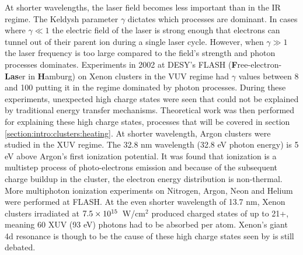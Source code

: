 At shorter wavelengths, the laser field becomes less important than in the IR
regime. The Keldysh parameter $\gamma$ dictates which processes are dominant. In
cases where $\gamma \ll 1$ the electric field of the laser is strong enough that
electrons can tunnel out of their parent ion during a single laser cycle.
However, when $\gamma \gg 1$ the laser frequency is too large compared to the
field's strength and photon processes dominates. Experiments in 2002 at
DESY's FLASH (\textbf{F}ree-electron-\textbf{Las}er in \textbf{H}amburg)\cite{Bostedt2009}
on Xenon clusters in the VUV regime had $\gamma$ values between 8 and
100\cite{Wabnitz2002} putting it in the regime dominated by photon processes.
During these experiments, unexpected high charge states were seen that could not
be explained by traditional energy transfer mechanisms. Theoretical work was
then performed for explaining these high charge states, processes that will be
covered in section \ref{section:intro:clusters:heating}. At shorter wavelength,
Argon clusters were studied in the XUV regime\cite{Bostedt2008}. The 32.8 nm
wavelength (32.8 eV photon energy) is 5 eV above Argon's first ionization
potential. It was found that ionization is a multistep process of
photo-electrons emission and because of the subsequent charge buildup in the
cluster, the electron energy distribution is non-thermal. More multiphoton
ionization experiments on Nitrogen, Argon, Neon and Helium were performed at
FLASH.
At the even shorter wavelength of 13.7 nm, Xenon clusters irradiated at
$\ten{7.5}{15}$~W/cm$^2$ produced charged states of up to 21+\cite{Sorokin2007,Richter2009},
meaning 60 XUV (93 eV) photons had to be absorbed per atom. Xenon's giant 4d
resonance is though to be the cause of these high charge states seen by is still
debated.




